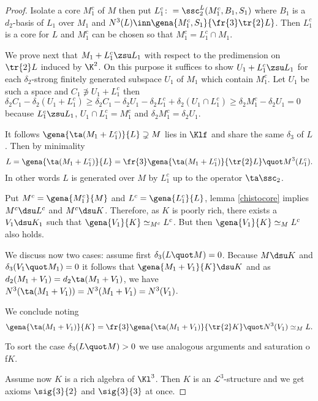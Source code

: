 \begin{proof}
Isolate a core $M_{1}^{c}$ of $M$ then put $L_{1}^{c}\colon=\ssc_{2}^{L}(M_{1}^{c},B_{1},S_{1})$ where
$B_{1}$ is a $d_{2}$-basis of $L_{1}$ over $M_{1}$ and $N^{3}(L)\inn\gena{M^{c}_{1},S_{1}}{\fr{3}\tr{2}L}$.
Then $L_{1}^{c}$ is a core for $L$ and $M_{1}^{c}$ can be chosen so that $M_{1}^{c}=L_{1}^{c}\cap M_{1}$.

We prove next that $M_{1}+L_{1}^{c}\zsu L_{1}$ with respect to the predimension on  $\tr{2}L$ induced by
$\K^{2}$. On this purpose it suffices to show $U_{1}+L_{1}^{c}\zsu L_{1}$ for each $\delta_{2}$-strong
finitely generated subspace $U_{1}$ of $M_{1}$ which contain $M_{1}^{c}$. Let $U_{1}$ be such a space
and $C_{1}\nni U_{1}+L_{1}^{c}$ then $\delta_{2}C_{1}-\delta_{2}(U_{1}+L_{1}^{c})\geq\delta_{2}C_{1}-
\delta_{2}U_{1}-\delta_{2}L_{1}^{c}+\delta_{2}(U_{1}\cap L_{1}^{c})\geq\delta_{2}M_{1}^{c}-\delta_{2}U_{1}=0$
because $L_{1}^{c}\zsu L_{1}$, $U_{1}\cap L_{1}^{c}=M_{1}^{c}$ and $\delta_{2}M_{1}^{c}=\delta_{2}U_{1}$.

It follows $\gena{\ta(M_{1}+L_{1}^{c})}{L}\supsetneq M$ lies in $\Klf$ and share the same $\delta_{3}$ of
$L$. Then by minimality
$$L=\gena{\ta(M_{1}+L_{1}^{c})}{L}=\fr{3}\gena{\ta(M_{1}+L_{1}^{c})}{\tr{2}L}\quot M^{3}(L_{1}^{c}).$$
In other words
$L$ is generated
over $M$ by $L_{1}^{c}$ up to the operator $\ta\ssc_{2}$.

Put $M^{c}=\gena{M^{c}_{1}}{M}$ and $L^{c}=\gena{L^{c}_{1}}{L}$,
lemma \ref{chistocore} implies $M^{c}\dsu L^{c}$ and $M^{c}\dsu K$.
Therefore, as $K$ is poorly rich, there exists a $V_{1}\dsu K_{1}$ such that
$\gena{V_{1}}{K}\simeq_{M^{c}}L^{c}$. But then $\gena{V_{1}}{K}\simeq_{M}L^{c}$ also holds.

We discuss now two cases: assume first $\delta_{3}(L\quot M)=0$. Because $M\dsu K$ and $\delta_{3}(V_{1}\quot M_{1})=0$ it follows 
that $\gena{M_{1}+V_{1}}{K}\dsu K$ and as $d_{2}(M_{1}+V_{1})=
d_{2}\ta(M_{1}+V_{1})$, we have  $N^{3}(\ta(M_{1}+V_{1}))=N^{3}(M_{1}+V_{1})=N^{3}(V_{1})$.

We conclude noting
$$\gena{\ta(M_{1}+V_{1})}{K}=\fr{3}\gena{\ta(M_{1}+V_{1})}{\tr{2}K}\quot N^{3}(V_{1})\simeq_{M}L.$$

To sort the case $\delta_{3}(L\quot M)>0$ we use analogous arguments and saturation o f$K$.

\medskip
Assume now $K$ is a rich algebra of $\Kl^{3}$.
Then $K$ is an $\mathcal{L}^{3}$-structure and we get axioms $\sig{3}{2}$ and $\sig{3}{3}$ at once.


\end{proof}
